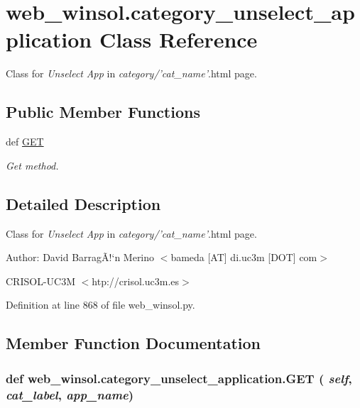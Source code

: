 \hypertarget{classweb__winsol_1_1category__unselect__application}{
\section{web\_\-winsol.category\_\-unselect\_\-application Class Reference}
\label{classweb__winsol_1_1category__unselect__application}
}
Class for {\em Unselect\/} {\em App\/} in {\em category/'cat\_\-name'\/}.html page.  


\subsection*{Public Member Functions}
\begin{CompactItemize}
\item 
def \hyperlink{classweb__winsol_1_1category__unselect__application_8284368688de607d06d4c50d88a65cb7}{GET}
\begin{CompactList}\small\item\em Get method. \item\end{CompactList}\end{CompactItemize}


\subsection{Detailed Description}
Class for {\em Unselect\/} {\em App\/} in {\em category/'cat\_\-name'\/}.html page. 

\begin{Desc}
\item[Author:]David Barrag\~{A}!`n Merino $<$bameda \mbox{[}AT\mbox{]} di.uc3m \mbox{[}DOT\mbox{]} com$>$ 

CRISOL-UC3M $<$htp://crisol.uc3m.es$>$ \end{Desc}




Definition at line 868 of file web\_\-winsol.py.

\subsection{Member Function Documentation}
\hypertarget{classweb__winsol_1_1category__unselect__application_8284368688de607d06d4c50d88a65cb7}{
\subsubsection[GET]{\setlength{\rightskip}{0pt plus 5cm}def web\_\-winsol.category\_\-unselect\_\-application.GET ( {\em self},  {\em cat\_\-label},  {\em app\_\-name})}}
\label{classweb__winsol_1_1category__unselect__application_8284368688de607d06d4c50d88a65cb7}


